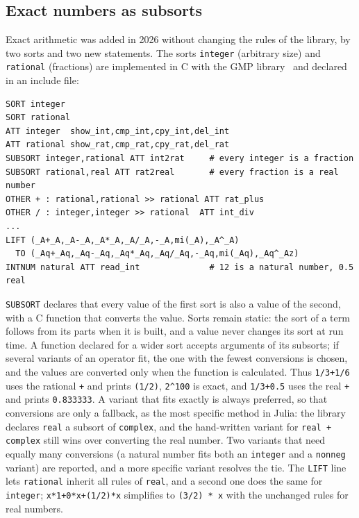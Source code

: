 \documentclass[11pt,a4paper]{article}
\begin{document}
\subsection{Exact numbers as subsorts}

Exact arithmetic was added in 2026 without changing the rules of the
library, by two sorts and two new statements. The sorts \texttt{integer}
(arbitrary size) and \texttt{rational} (fractions) are implemented in C with
the GMP library~\cite{gmp} and declared in an include file:

\begin{lstlisting}
SORT integer
SORT rational
ATT integer  show_int,cmp_int,cpy_int,del_int
ATT rational show_rat,cmp_rat,cpy_rat,del_rat
SUBSORT integer,rational ATT int2rat     # every integer is a fraction
SUBSORT rational,real ATT rat2real       # every fraction is a real number
OTHER + : rational,rational >> rational ATT rat_plus
OTHER / : integer,integer >> rational  ATT int_div
...
LIFT (_A+_A,_A-_A,_A*_A,_A/_A,-_A,mi(_A),_A^_A)
  TO (_Aq+_Aq,_Aq-_Aq,_Aq*_Aq,_Aq/_Aq,-_Aq,mi(_Aq),_Aq^_Az)
INTNUM natural ATT read_int              # 12 is a natural number, 0.5 real
\end{lstlisting}

\texttt{SUBSORT} declares that every value of the first sort is also a value
of the second, with a C function that converts the value. Sorts remain
static: the sort of a term follows from its parts when it is built, and a
value never changes its sort at run time. A function declared for a wider
sort accepts arguments of its subsorts; if several variants of an operator
fit, the one with the fewest conversions is chosen, and the values are
converted only when the function is calculated. Thus \texttt{1/3+1/6}
uses the rational \texttt{+} and prints \texttt{(1/2)}, \texttt{2\^{}100}
is exact, and \texttt{1/3+0.5} uses the real \texttt{+} and prints
\texttt{0.833333}. A variant that fits exactly is always preferred, so that
conversions are only a fallback, as the most specific method in Julia: the
library declares \texttt{real} a subsort of \texttt{complex}, and the
hand-written variant for \texttt{real + complex} still wins over converting
the real number. Two variants that need equally many conversions (a
natural number fits both an \texttt{integer} and a \texttt{nonneg}
variant) are reported, and a more specific variant resolves the tie. The \texttt{LIFT} line lets \texttt{rational} inherit all
rules of \texttt{real}, and a second one does the same for
\texttt{integer}; \texttt{x*1+0*x+(1/2)*x} simplifies to \texttt{(3/2) * x}
with the unchanged rules for real numbers.
\end{document}
